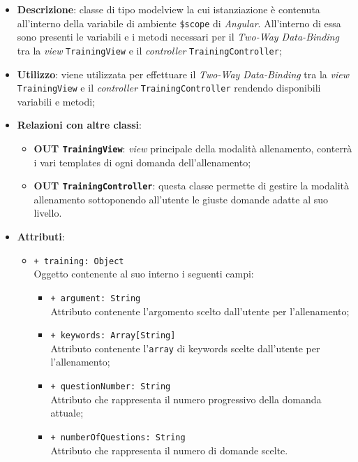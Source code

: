 	\begin{itemize}
		\item \textbf{Descrizione}: classe di tipo modelview la cui istanziazione è contenuta all'interno della variabile di ambiente \texttt{\$scope} di \textit{Angular}. All'interno di essa sono presenti le variabili e i metodi necessari per il \textit{Two-Way Data-Binding} tra la \textit{view} \texttt{TrainingView} e il \textit{controller} \texttt{TrainingController};
		\item \textbf{Utilizzo}: viene utilizzata per effettuare il \textit{Two-Way Data-Binding} tra la \textit{view}\\ \texttt{TrainingView} e il \textit{controller} \texttt{TrainingController} rendendo disponibili variabili e metodi;
		\item \textbf{Relazioni con altre classi}: 
		\begin{itemize}
			\item \textbf{OUT \texttt{TrainingView}}: \textit{view} principale della modalità allenamento, conterrà i vari templates di ogni domanda dell'allenamento; 
			\item \textbf{OUT \texttt{TrainingController}}: questa classe permette di gestire la modalità allenamento sottoponendo all'utente le giuste domande adatte al suo livello.
		\end{itemize}
		\item \textbf{Attributi}: 
		\begin{itemize}
			\item \texttt{+ training: Object} \\ Oggetto contenente al suo interno i seguenti campi:
			\begin{itemize}
				\item \texttt{+ argument: String} \\ Attributo contenente l'argomento scelto dall'utente per l'allenamento;
				\item \texttt{+ keywords: Array[String]} \\ Attributo contenente l'\texttt{array} di keywords scelte dall'utente per l'allenamento;
				\item \texttt{+ questionNumber: String} \\ Attributo che rappresenta il numero progressivo della domanda attuale;
				\item \texttt{+ numberOfQuestions: String} \\ Attributo che rappresenta il numero di domande scelte.
			\end{itemize}

\end{itemize}
\end{itemize}
